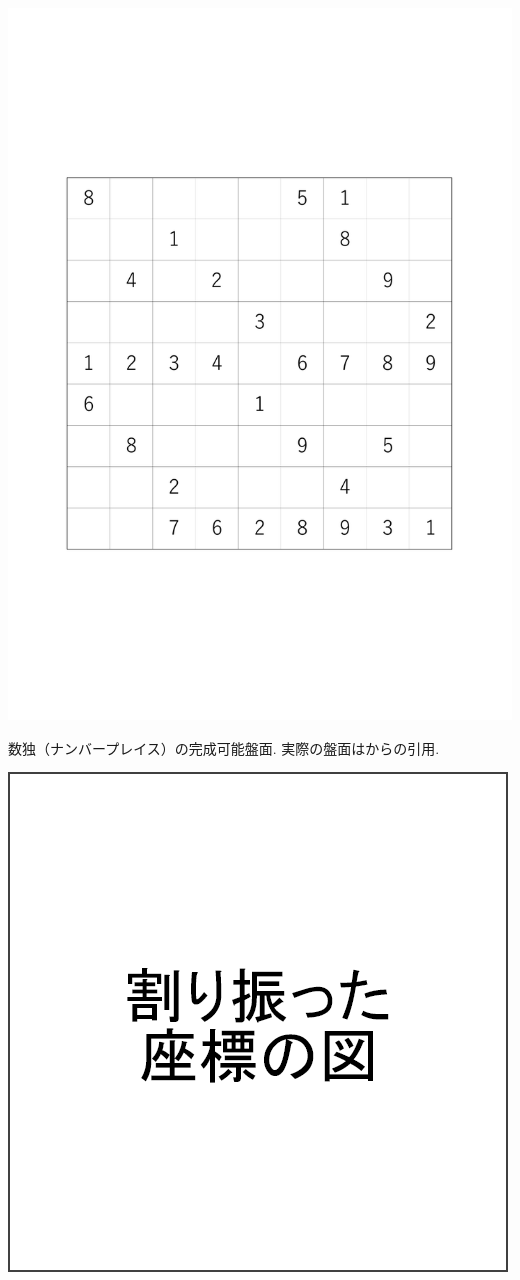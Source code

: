 \begin{clearpagefigure}
  \includegraphics[width=0.85\linewidth,clip]{fig/NumberPlaceQuestion.pdf}
  \caption{数独（ナンバープレイス）の完成可能盤面. 実際の盤面は\cite{web:Sudoku}からの引用. }
  \label{figure:NumberPlaceQuestion}
\end{clearpagefigure}

\begin{clearpagefigure}
  \includegraphics[width=0.85\linewidth,clip]{fig/coordinate.png}
  \caption{}
  \label{figure:Coordinate}
\end{clearpagefigure}

